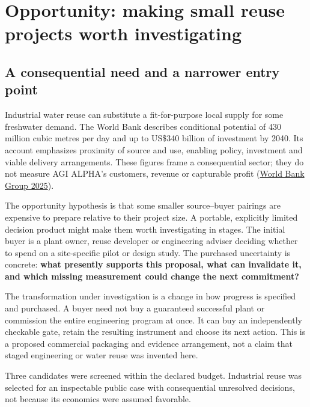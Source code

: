 \documentclass[
  11pt,
  letterpaper,
]{article}
\begin{document}
\hypertarget{opportunity-making-small-reuse-projects-worth-investigating}{%
\section{Opportunity: making small reuse projects worth
investigating}\label{opportunity-making-small-reuse-projects-worth-investigating}}

\hypertarget{a-consequential-need-and-a-narrower-entry-point}{%
\subsection{A consequential need and a narrower entry
point}\label{a-consequential-need-and-a-narrower-entry-point}}

Industrial water reuse can substitute a fit-for-purpose local supply for
some freshwater demand. The World Bank describes conditional potential
of 430 million cubic metres per day and up to US\$340 billion of
investment by 2040. Its account emphasizes proximity of source and use,
enabling policy, investment and viable delivery arrangements. These
figures frame a consequential sector; they do not measure AGI ALPHA's
customers, revenue or capturable profit
(\protect\hyperlink{ref-worldbank2025}{World Bank Group 2025}).

The opportunity hypothesis is that some smaller source--buyer pairings
are expensive to prepare relative to their project size. A portable,
explicitly limited decision product might make them worth investigating
in stages. The initial buyer is a plant owner, reuse developer or
engineering adviser deciding whether to spend on a site-specific pilot
or design study. The purchased uncertainty is concrete: \textbf{what
presently supports this proposal, what can invalidate it, and which
missing measurement could change the next commitment?}

The transformation under investigation is a change in how progress is
specified and purchased. A buyer need not buy a guaranteed successful
plant or commission the entire engineering program at once. It can buy
an independently checkable gate, retain the resulting instrument and
choose its next action. This is a proposed commercial packaging and
evidence arrangement, not a claim that staged engineering or water reuse
was invented here.

Three candidates were screened within the declared budget. Industrial
reuse was selected for an inspectable public case with consequential
unresolved decisions, not because its economics were assumed favorable.
\end{document}

